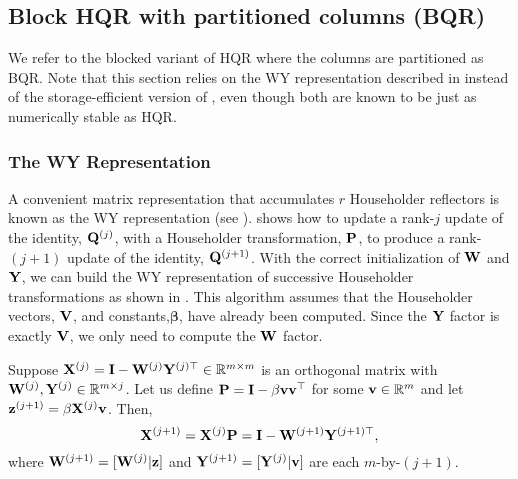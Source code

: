 \subsection{Block HQR with partitioned columns (BQR)}\label{sec:BQR}
We refer to the blocked variant of HQR where the columns are partitioned as BQR. 
Note that this section relies on the WY representation described in \cite{Bischof1987} instead of the storage-efficient version of \cite{Schreiber1989}, even though both are known to be just as numerically stable as HQR.
\subsubsection{The WY Representation}
A convenient matrix representation that accumulates $r$ Householder reflectors is known as the WY representation (see \cite{Bischof1987,golub2013matrix}).
 shows how to update a rank-$j$ update of the identity, $\mathbf{Q}^{(j)}$, with a Householder transformation, $\mathbf{P}$, to produce a rank-$(j+1)$ update of the identity, $\mathbf{Q}^{(j+1)}$. 
With the correct initialization of $\mathbf{W}$ and $\mathbf{Y}$, we can build the WY representation of successive Householder transformations as shown in . 
This algorithm assumes that the Householder vectors, $\mathbf{V}$, and constants,$\bm{\beta}$, have already been computed.
Since the $\mathbf{Y}$ factor is exactly $\mathbf{V}$, we only need to compute the $\mathbf{W}$ factor.
\begin{lemma}\label{lem:WY}
	Suppose $\mathbf{X}^{(j)}=\mathbf{I}-\mathbf{W}^{(j)}\mathbf{Y}^{(j)\top}\in\mathbb{R}^{m\times m}$ is an orthogonal matrix with $\mathbf{W}^{(j)},\mathbf{Y}^{(j)}\in\mathbb{R}^{m\times j}$.
	Let us define $\mathbf{P}=\mathbf{I}-\beta\mathbf{vv}^{\top}$ for some $\mathbf{v}\in\mathbb{R}^m$ and let $\mathbf{z}^{(j+1)}=\beta\mathbf{X}^{(j)}\mathbf{v}$.
	Then, \[\mathbf{X}^{(j+1)} = \mathbf{X}^{(j)}\mathbf{P} = \mathbf{I} - \mathbf{W}^{(j+1)}\mathbf{Y}^{(j+1)\top}, \]where $ \mathbf{W}^{(j+1)} =[\mathbf{W}^{(j)}|\mathbf{z}]$ and $ \mathbf{Y}^{(j+1)}=[\mathbf{Y}^{(j)}|\mathbf{v}]$ are each $m$-by-$(j+1)$. 
\end{lemma}
%

